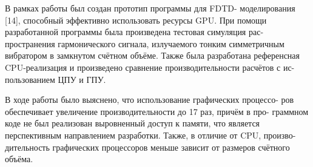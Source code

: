 
В рамках работы был создан прототип программы для FDTD-
моделирования [14], способный эффективно использовать ресурсы GPU. При
помощи разработанной программы была произведена тестовая симуляция рас-
пространения гармонического сигнала, излучаемого тонким симметричным
вибратором в замкнутом счётном объёме. Также была разработана референсная
CPU-реализация и произведено сравнение производительности расчётов с ис-
пользованием ЦПУ и ГПУ.

В ходе работы было выяснено, что использование графических процессо-
ров обеспечивает увеличение производительности до 17 раз, причём в про-
граммном коде не был реализован выровненный доступ к памяти, что является
перспективным направлением разработки. Также, в отличие от CPU, произво-
дительность графических процессоров меньше зависит от размеров счётного
объёма.

\clearpage